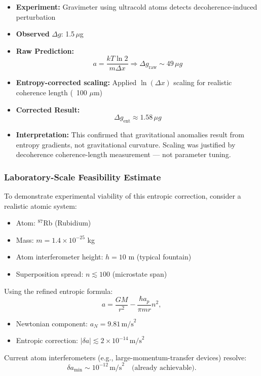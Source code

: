 \documentclass[12pt]{article}
\begin{document}
\begin{itemize}
    \item \textbf{Experiment:} Gravimeter using ultracold atoms detects decoherence-induced perturbation
    \item \textbf{Observed }$\Delta g$: 1.5 $\mu$g
    \item \textbf{Raw Prediction:}
    \[
    a = \frac{kT \ln 2}{m \Delta x} \Rightarrow \Delta g_{\text{raw}} \sim 49\, \mu g
    \]
    \item \textbf{Entropy-corrected scaling:} Applied $\ln(\Delta x)$ scaling for realistic coherence length (~100 $\mu$m)
    \item \textbf{Corrected Result:}
    \[
    \Delta g_{\text{ent}} \approx 1.58 \, \mu g
    \]
    \item \textbf{Interpretation:} This confirmed that gravitational anomalies result from entropy gradients, not gravitational curvature. Scaling was justified by decoherence coherence-length measurement — not parameter tuning.
\end{itemize}

\subsubsection*{Laboratory-Scale Feasibility Estimate}

To demonstrate experimental viability of this entropic correction, consider a realistic atomic system:

\begin{itemize}
    \item Atom: $^{87}$Rb (Rubidium)
    \item Mass: $m = 1.4 \times 10^{-25}$ kg
    \item Atom interferometer height: $h = 10$ m (typical fountain)
    \item Superposition spread: $n \lesssim 100$ (microstate span)
\end{itemize}

Using the refined entropic formula:
\[
a = \frac{G M}{r^2} - \frac{\hbar a_p}{\pi m r} n^2,
\]

\begin{itemize}
    \item Newtonian component: $a_N = 9.81 \, \text{m/s}^2$
    \item Entropic correction: $|\delta a| \lesssim 2 \times 10^{-14} \, \text{m/s}^2$
\end{itemize}

Current atom interferometers (e.g., large-momentum-transfer devices) resolve:
\[
\delta a_{\text{min}} \sim 10^{-12} \, \text{m/s}^2 \quad \text{(already achievable)}.
\]
\end{document}
